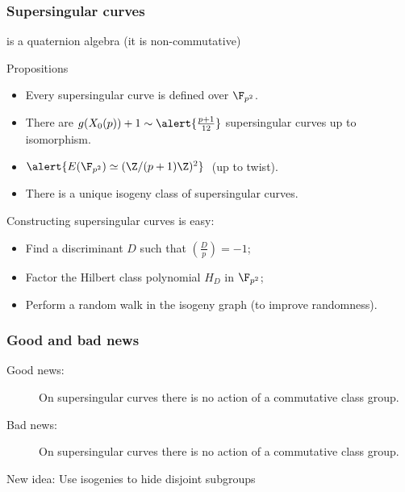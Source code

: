 \documentclass{beamer}
\renewcommand{\emph}[1]{}
\begin{document}
\begin{frame}
  \frametitle{Supersingular curves}

  \emph{$\Q\otimes\End(E)$} is a quaternion algebra (it is non-commutative)

  \begin{block}{Propositions}
    \begin{itemize}
    \item Every supersingular curve is defined over \alert{$\F_{p^2}$}.
    \item There are $g(X_0(p))+1 \sim\alert{\frac{p+1}{12}}$ supersingular curves
      up to isomorphism.
    \item $\alert{E(\F_{p^2}) \simeq (\Z/(p+1)\Z)^2}\;$ (up to twist).
    \item There is a \alert{unique isogeny class} of supersingular
      curves.
    \end{itemize}
  \end{block}

  Constructing supersingular curves is easy:
  \begin{itemize}
  \item Find a discriminant $D$ such that $\left(\frac{D}{p}\right)=-1$;
  \item Factor the Hilbert class polynomial $H_D$ in $\F_{p^2}$;
  \item Perform a random walk in the isogeny graph (to improve randomness).
  \end{itemize}
\end{frame}


\begin{frame}
  \frametitle{Good and bad news}
  
  \begin{description}
  \item[Good news:] On supersingular curves there is no action of a
    commutative class group.
  \item[Bad news:] On supersingular curves there is no action of a
    commutative class group.
  \end{description}

  \alert{New idea:} Use isogenies to hide disjoint subgroups
  \emph{$G,H\subset E$}

  \begin{center}
  \end{center}
\end{frame}
\end{document}
